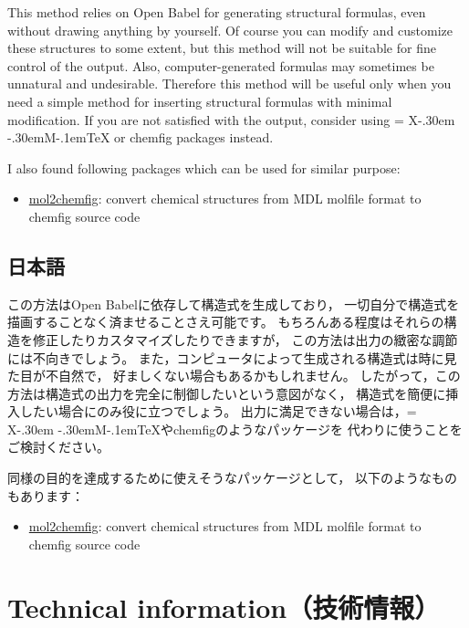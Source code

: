 \documentclass[12pt]{ltjsarticle}
\def\XyM{\ifnum\fam=-1\relax\fam=0\relax\fi\TestCount=\fam%
X\kern-.30em\smash{\raise.50ex\hbox{$\fam\TestCount\Upsilon$}}%
\kern-.30em{M}}
\def\XyMTeX{\XyM\kern-.1em\TeX}
\begin{document}
This method relies on Open Babel for generating structural formulas,
even without drawing anything by yourself.
Of course you can modify and customize these structures to some extent,
but this method will not be suitable for fine control of the output.
Also, computer-generated formulas may sometimes be unnatural and undesirable.
Therefore this method will be useful only when you need a simple method
for inserting structural formulas with minimal modification.
If you are not satisfied with the output, consider using {\XyMTeX} or
\textsf{chemfig} packages instead.

I also found following packages which can be used for similar purpose:
\begin{itemize}
  \item \href{http://www.ctan.org/pkg/mol2chemfig}{\textsf{mol2chemfig}}:
    convert chemical structures from MDL molfile format
    to \textsf{chemfig} source code
\end{itemize}

\subsection{日本語}

この方法はOpen Babelに依存して構造式を生成しており，
一切自分で構造式を描画することなく済ませることさえ可能です。
もちろんある程度はそれらの構造を修正したりカスタマイズしたりできますが，
この方法は出力の緻密な調節には不向きでしょう。
また，コンピュータによって生成される構造式は時に見た目が不自然で，
好ましくない場合もあるかもしれません。
したがって，この方法は構造式の出力を完全に制御したいという意図がなく，
構造式を簡便に挿入したい場合にのみ役に立つでしょう。
出力に満足できない場合は，\XyMTeX や\textsf{chemfig}のようなパッケージを
代わりに使うことをご検討ください。

同様の目的を達成するために使えそうなパッケージとして，
以下のようなものもあります：
\begin{itemize}
  \item \href{http://www.ctan.org/pkg/mol2chemfig}{\textsf{mol2chemfig}}:
    convert chemical structures from MDL molfile format
    to \textsf{chemfig} source code
\end{itemize}

\clearpage

\section{Technical information（技術情報）} \label{detail}
\end{document}
